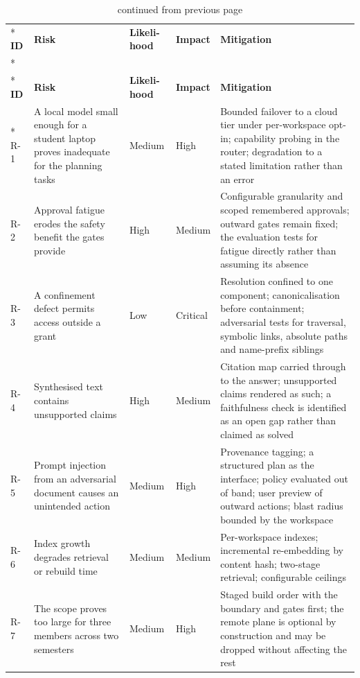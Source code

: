 \documentclass{FastFyp}
\begin{document}
{\small
{}
\begin{longtable}{|p{0.8cm}|p{3.6cm}|p{1.3cm}|p{1.3cm}|p{5.0cm}|}
\caption{Project risks.}\label{tab:risks}\\*
\hline
\textbf{ID} & \textbf{Risk} & \textbf{Likeli-hood} & \textbf{Impact} & \textbf{Mitigation} \\*
\hline
\endfirsthead
\caption[]{continued from previous page}\\*
\hline
\textbf{ID} & \textbf{Risk} & \textbf{Likeli-hood} & \textbf{Impact} & \textbf{Mitigation} \\*
\hline
\endhead
\hline
R-1 & A local model small enough for a student laptop proves inadequate for the planning tasks & Medium & High & Bounded failover to a cloud tier under per-workspace opt-in; capability probing in the router; degradation to a stated limitation rather than an error \\
\hline
R-2 & Approval fatigue erodes the safety benefit the gates provide & High & Medium & Configurable granularity and scoped remembered approvals; outward gates remain fixed; the evaluation tests for fatigue directly rather than assuming its absence \\
\hline
R-3 & A confinement defect permits access outside a grant & Low & Critical & Resolution confined to one component; canonicalisation before containment; adversarial tests for traversal, symbolic links, absolute paths and name-prefix siblings \\
\hline
R-4 & Synthesised text contains unsupported claims & High & Medium & Citation map carried through to the answer; unsupported claims rendered as such; a faithfulness check is identified as an open gap rather than claimed as solved \\
\hline
R-5 & Prompt injection from an adversarial document causes an unintended action & Medium & High & Provenance tagging; a structured plan as the interface; policy evaluated out of band; user preview of outward actions; blast radius bounded by the workspace \\
\hline
R-6 & Index growth degrades retrieval or rebuild time & Medium & Medium & Per-workspace indexes; incremental re-embedding by content hash; two-stage retrieval; configurable ceilings \\
\hline
R-7 & The scope proves too large for three members across two semesters & Medium & High & Staged build order with the boundary and gates first; the remote plane is optional by construction and may be dropped without affecting the rest \\

\end{longtable}}
\end{document}
